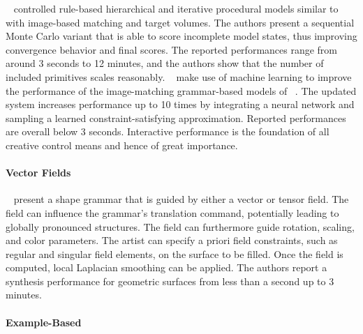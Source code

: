 \citeauthor*{ritchie_2015_cpm}~\cite{ritchie_2015_cpm} controlled rule-based hierarchical and iterative procedural models similar to \citeauthor*{talton_2011_mpm}~\cite{talton_2011_mpm} with image-based matching and target volumes. The authors present a sequential Monte Carlo variant that is able to score incomplete model states, thus improving convergence behavior and final scores. The reported performances range from around 3 seconds to 12 minutes, and the authors show that the number of included primitives scales reasonably. \citeauthor*{ritchie_2016_ngp}~\cite{ritchie_2016_ngp} make use of machine learning to improve the performance of the image-matching grammar-based models of \citeauthor*{ritchie_2015_cpm}~\cite{ritchie_2015_cpm}. The updated system increases performance up to 10 times by integrating a neural network and sampling a learned constraint-satisfying approximation. Reported performances are overall below 3 seconds. Interactive performance is the foundation of all creative control means and hence of great importance.

\paragraph*{Vector Fields}
\label{para:analysis_rulebased_vector_fields}

\citeauthor*{yuanyuan_2011_gso}~\cite{yuanyuan_2011_gso} present a shape grammar that is guided by either a vector or tensor field. The field can influence the grammar's translation command, potentially leading to globally pronounced structures. The field can furthermore guide rotation, scaling, and color parameters. The artist can specify a priori field constraints, such as regular and singular field elements, on the surface to be filled. Once the field is computed, local Laplacian smoothing can be applied. The authors report a synthesis performance for geometric surfaces from less than a second up to 3 minutes.
\paragraph*{Example-Based}
\label{para:analysis_rulebased_example}

